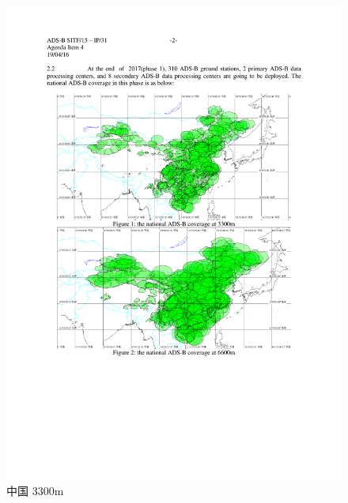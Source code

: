 \begin{figure}[htbp]
\centering
\includegraphics[width=12cm]{pic/china_3300m.pdf}
\caption{中国 3300m }
\label{fig:china_3300m}
\end{figure}

